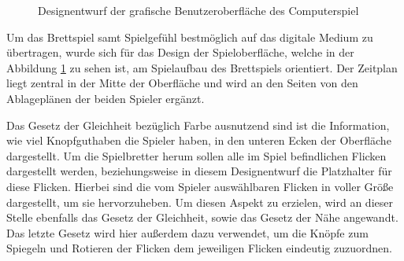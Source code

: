 \begin{figure}[!ht]
    \centering
    \caption{Designentwurf der grafische Benutzeroberfläche des Computerspiel}
    \label{fig:design-game-ui}
\end{figure}

Um das Brettspiel samt Spielgefühl bestmöglich auf das digitale Medium zu übertragen, wurde sich für das Design der Spieloberfläche, welche in der Abbildung \ref{fig:design-game-ui} zu sehen ist, am Spielaufbau des Brettspiels orientiert. Der Zeitplan liegt zentral in der Mitte der Oberfläche und wird an den Seiten von den Ablageplänen der beiden Spieler ergänzt.

Das Gesetz der Gleichheit bezüglich Farbe ausnutzend sind ist die Information, wie viel Knopfguthaben die Spieler haben, in den unteren Ecken der Oberfläche dargestellt. Um die Spielbretter herum sollen alle im Spiel befindlichen Flicken dargestellt werden, beziehungsweise in diesem Designentwurf die Platzhalter für diese Flicken. Hierbei sind die vom Spieler auswählbaren Flicken in voller Größe dargestellt, um sie hervorzuheben. Um diesen Aspekt zu erzielen, wird an dieser Stelle ebenfalls das Gesetz der Gleichheit, sowie das Gesetz der Nähe angewandt. Das letzte Gesetz wird hier außerdem dazu verwendet, um die Knöpfe zum Spiegeln und Rotieren der Flicken dem jeweiligen Flicken eindeutig zuzuordnen.


